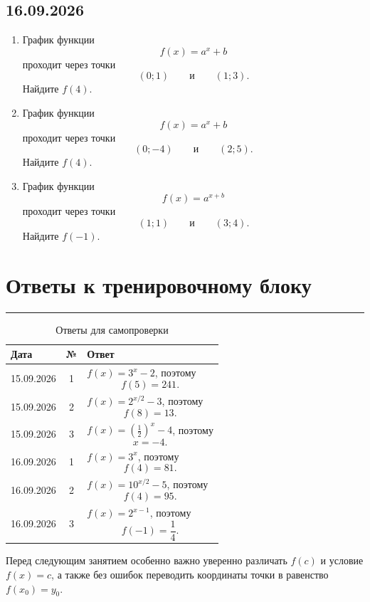 \documentclass[a4paper,12pt]{article}
\newcommand{\sectionline}{%
  \vspace{-0.2em}
  \textcolor{accent}{\rule{\linewidth}{0.5pt}}
  \vspace{0.25em}
}
\begin{document}
\vspace{5mm}

\subsection*{16.09.2026}

\begin{enumerate}

  \item
  График функции
  \[
      f(x)=a^x+b
  \]
  проходит через точки
  \[
      (0;1)
      \qquad\text{и}\qquad
      (1;3).
  \]
  Найдите $f(4)$.

  \item
  График функции
  \[
      f(x)=a^x+b
  \]
  проходит через точки
  \[
      (0;-4)
      \qquad\text{и}\qquad
      (2;5).
  \]
  Найдите $f(4)$.

  \item
  График функции
  \[
      f(x)=a^{x+b}
  \]
  проходит через точки
  \[
      (1;1)
      \qquad\text{и}\qquad
      (3;4).
  \]
  Найдите $f(-1)$.

\end{enumerate}


\clearpage

\section*{Ответы к тренировочному блоку}
\sectionline

\begin{table}[ht]
\centering
\caption{Ответы для самопроверки}

\begin{tabularx}{\linewidth}{@{} l c X @{}}

\toprule

\textbf{Дата}
&
\textbf{№}
&
\textbf{Ответ}
\\

\midrule

15.09.2026
&
1
&
$f(x)=3^x-2$, поэтому
\[
f(5)=241.
\]
\\

15.09.2026
&
2
&
$f(x)=2^{x/2}-3$, поэтому
\[
f(8)=13.
\]
\\

15.09.2026
&
3
&
$f(x)=\left(\frac12\right)^x-4$, поэтому
\[
x=-4.
\]
\\

\midrule

16.09.2026
&
1
&
$f(x)=3^x$, поэтому
\[
f(4)=81.
\]
\\

16.09.2026
&
2
&
$f(x)=10^{x/2}-5$, поэтому
\[
f(4)=95.
\]
\\

16.09.2026
&
3
&
$f(x)=2^{x-1}$, поэтому
\[
f(-1)=\frac14.
\]
\\

\bottomrule

\end{tabularx}
\end{table}

\vfill

\begin{center}
\textcolor{textgray}{
\small
Перед следующим занятием особенно важно уверенно различать
$f(c)$ и условие $f(x)=c$,
а также без ошибок переводить координаты точки
в равенство $f(x_0)=y_0$.
}
\end{center}
\end{document}
